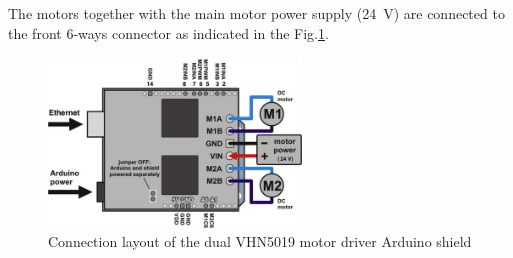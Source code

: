 \documentclass[12pt,a4,twoside]{article}
\begin{document}
The motors together with the main motor power supply (24~V) are connected to the front 6-ways connector as indicated in the Fig.\ref{figMotorShieldUse}. 

\begin{figure}[t!]
\centering
\includegraphics[width=0.6\textwidth]{pololu_use.jpg}
\caption{\label{figMotorShieldUse} {Connection layout of the dual VHN5019 motor driver Arduino shield}}
\end{figure}
\end{document}
